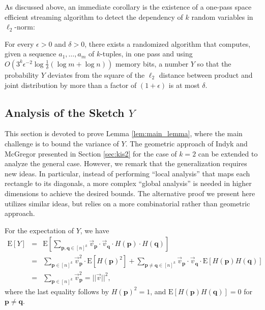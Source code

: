 \def\draft{0}  \documentclass[proceedings]{stacs}
\theoremstyle{plain}\newtheorem{satz}[thm]{Satz}
\theoremstyle{definition}\newtheorem{crucial}[thm]{Crucial Definition}
\newcommand{\vecv}{{\vec{v}} }
\newcommand{\bfp}{{\mathbf p} }
\newcommand{\bfq}{{\mathbf q} }
\begin{document}
As discussed above, an immediate corollary is the existence of a one-pass space efficient streaming algorithm to detect the dependency of $k$ random variables in $\ell_2$-norm:

\begin{corollary}For every $\epsilon > 0$ and $\delta > 0$, there exists a randomized algorithm that computes,
given a sequence $a_1, \dots, a_m$ of $k$-tuples, in one pass and using
$O(3^k\epsilon^{-2}\log \frac 1 \delta(\log m + \log n))$ memory bits,
a number $Y$ so that the probability $Y$ deviates from the square of the $\ell_2$
distance between product and joint distribution by more than a factor of
$(1+\epsilon)$ is at most $\delta$.
\end{corollary}














\subsection{Analysis of the Sketch $Y$}\label{sec:analysis}

This section is devoted to prove Lemma \ref{lem:main_lemma}, where the main challenge is to bound the variance of $Y$.  The geometric approach of Indyk and McGregor \cite{IM08} presented in Section \ref{sec:kis2} for the case of $k=2$ can be extended to analyze the general case. However, we remark that the generalization requires new ideas. In particular, instead of performing ``local analysis'' that maps each rectangle to its diagonals, a more complex ``global analysis'' is needed in higher dimensions to achieve the desired bounds. The alternative proof we present here utilizes similar ideas, but relies on a more combinatorial rather than geometric approach.

For the expectation of $Y$, we have
\begin{eqnarray*}
\mathrm E[Y] & = & \mathrm E\left[\sum_{\bfp, \bfq \in [n]^k}\vecv_{\bfp}\cdot \vecv_{\bfq}\cdot H(\bfp) \cdot H(\bfq)\right] \\
& = & \sum_{\bfp \in [n]^k}\vec v_{\bfp}^2 \cdot \mathrm E\left[H(\bfp)^2\right] + \sum_{\bfp \neq \bfq \in [n]^k}\vecv_{\bfp} \cdot \vecv_{\bfq} \cdot \mathrm E\left[H(\bfp)H(\bfq)\right] \\
& = & \sum_{\bfp \in [n]^k}\vec v_{\bfp}^2 = ||\vecv||^2,
\end{eqnarray*}
where the last equality follows by $H(\bfp)^2 = 1$, and $\mathrm E\left[H(\bfp)H(\bfq)\right] =0$ for $\bfp \neq \bfq$.
\end{document}
